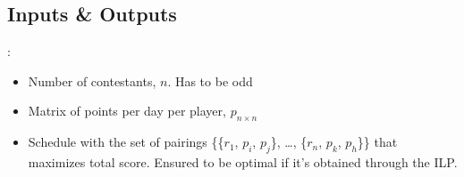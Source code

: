 \documentclass[9pt, aspectratio=169, xcolor=table]{beamer}
\begin{document}
\subsection{Inputs \& Outputs}
\begin{frame}{\secname: \subsecname}
    \begin{tcolorbox}[colback=gray!30, colframe=Veronablue, arc=0pt, outer arc=0pt, title = \textbf{Inputs}]
    \begin{itemize}
	\item Number of contestants, $n$. Has to be odd
	\item Matrix of points per day per player, $p_{n \times n}$
    \end{itemize}
    \end{tcolorbox}

    \begin{tcolorbox}[colback=gray!30, colframe=Veronablue, arc=0pt, outer arc=0pt, title = \textbf{Outputs}]
    \begin{itemize}
	\item Schedule with the set of pairings \{\{$r_1$, $p_i$, $p_j$\}, \dots, \{$r_n$, $p_k$, $p_h$\}\} that maximizes total score. Ensured to be optimal if it's obtained through the ILP.
    \end{itemize}
    \end{tcolorbox}
    
\end{frame}
\end{document}
